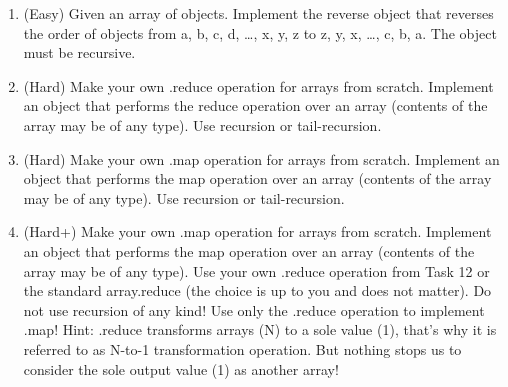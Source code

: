 \documentclass[12pt]{book}
\begin{document}
\begin{enumerate}
    \item  (Easy) Given an array of objects. Implement the reverse object that reverses the order of objects from a, b, c, d, …, x, y, z to z, y, x, …, c, b, a. The object must be recursive.
    \item (Hard) Make your own .reduce operation for arrays from scratch. Implement an object that performs the reduce operation over an array (contents of the array may be of any type). Use recursion or tail-recursion.
    \item (Hard) Make your own .map operation for arrays from scratch. Implement an object that performs the map operation over an array (contents of the array may be of any type). Use recursion or tail-recursion.
    \item (Hard+) Make your own .map operation for arrays from scratch. Implement an object that performs the map operation over an array (contents of the array may be of any type). Use your own .reduce operation from Task 12 or the standard array.reduce (the choice is up to you and does not matter). Do not use recursion of any kind! Use only the .reduce operation to implement .map! Hint: .reduce transforms arrays (N) to a sole value (1), that’s why it is referred to as N-to-1 transformation operation. But nothing stops us to consider the sole output value (1) as another array!
\end{enumerate}
\end{document}
